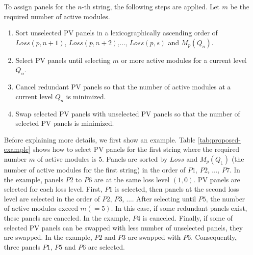 \documentclass[conference]{pvsctran}
\begin{document}
To assign panels for the $n$-th string, the following steps are applied. Let $m$ be the required number of active modules.
\begin{enumerate}
\item Sort unselected PV panels in a lexicographically ascending order of $Loss(p,n+1)$, $Loss(p,n+2)$,$\ldots$, $Loss(p,s)$ and $M_{p}(Q_{n})$.
\item Select PV panels until selecting $m$ or more active modules for a current level $Q_{n}$.
\item Cancel redundant PV panels so that the number of active modules at a current level $Q_{n}$ is minimized.
\item Swap selected PV panels with unselected PV panels so that the number of selected PV panels is minimized.
\end{enumerate}

Before explaining more details, we first show an example.
Table \ref{tab:proposed-example} shows how to select PV panels for the first string where the required number $m$ of active modules is 5. 
Panels are sorted by $Loss$ and $M_{p}(Q_{1})$ (the number of active modules for the first string) in the order of $P1$, $P2$, $\ldots$, $P7$. 
In the example, panels $P2$ to $P6$ are at the same loss level $(1,0)$. 
PV panels are selected for each loss level. First, $P1$ is selected, then panels at the second loss level are selected in the order of $P2$, $P3$, $\ldots$. After selecting until $P5$, the number of active modules exceed $m (=5)$. In this case, if some redundant panels exist, these panels are canceled. In the example, $P4$ is canceled. Finally, if some of selected PV panels can be swapped with less number of unselected panels, they are swapped. In the example, $P2$ and $P3$ are swapped with $P6$. Consequently, three panels $P1$, $P5$ and $P6$ are selected. 
\end{document}
